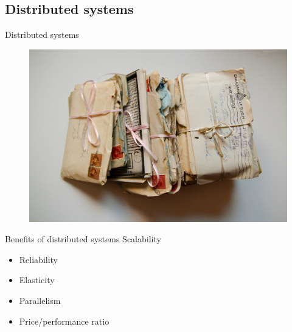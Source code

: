 \documentclass[10pt]{beamer}
\begin{document}
\subsection{Distributed systems}

\begin{frame}[fragile]{Distributed systems}

  \begin{figure}[!h]
    \begin{center}
      \includegraphics[width=1\textwidth]{../figures/letter.jpg}
    \end{center}
  \end{figure}
\end{frame}


\begin{frame}[fragile]{Benefits of distributed systems}
  Scalability
  \begin{itemize}
  \item Reliability
  \item Elasticity
  \item Parallelism
  \item Price/performance ratio
  \end{itemize}
\end{frame}
\end{document}
